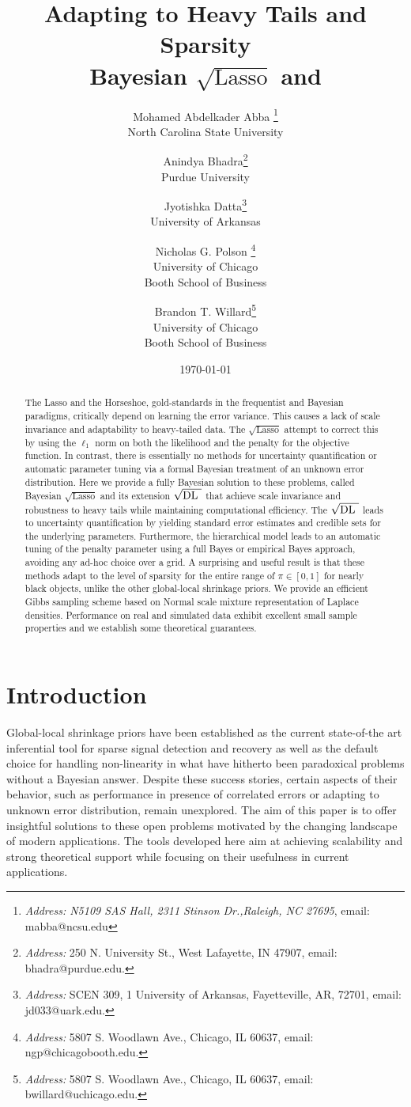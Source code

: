 \documentclass[10pt]{article}
\title{Adapting to Heavy Tails and Sparsity \\
Bayesian $\sqrt{\text{Lasso}}$ and \sqdl{}}
\author{
  Mohamed Abdelkader Abba \footnote{{\em Address: N5109 SAS Hall, 2311 Stinson Dr.,Raleigh, NC 27695}, email: mabba@ncsu.edu} \\
	North Carolina State University 
	\and
  Anindya Bhadra\footnote{
  {\em Address:} 250 N. University St., West Lafayette, IN 47907, 
  email: bhadra@purdue.edu.} \\
  Purdue University
  \and Jyotishka Datta\footnote{
  {\em Address:} SCEN 309, 1 University of Arkansas, Fayetteville, AR, 72701, 
  email: jd033@uark.edu.}\\ 
  University of Arkansas \\
  \and Nicholas G. Polson \footnote{
  {\em Address:} 5807 S. Woodlawn Ave., Chicago, IL 60637, 
  email: ngp@chicagobooth.edu.}  \\
  University of Chicago  \\
  Booth School of Business
  \and 
  Brandon T. Willard\footnote{
  {\em Address:} 5807 S. Woodlawn Ave., Chicago, IL 60637, 
  email: bwillard@uchicago.edu.} \\
  University of Chicago  \\
  Booth School of Business
}
\date{\today}
\def\sql{$\sqrt{\text{Lasso}}$}
\def\sqdl{$\sqrt{\text{\rm{DL} }}$}
\begin{document}
\maketitle

\begin{abstract}
\noindent 
The Lasso and the Horseshoe, gold-standards in the frequentist and Bayesian paradigms, critically depend on learning the error variance. This causes a lack of scale invariance and adaptability to heavy-tailed data. The \sql{} \citep{belloni2011square} attempt to correct this by using the $\ell_1$ norm on both the likelihood and the penalty for the objective function. In contrast, there is essentially no methods for uncertainty quantification or automatic parameter tuning via a formal Bayesian treatment of an unknown error distribution. Here we provide a fully Bayesian solution to these problems, called Bayesian \sql{} and its extension \sqdl{} that achieve scale invariance and robustness to heavy tails while maintaining computational efficiency. %
The \sqdl{} leads to uncertainty quantification by yielding standard error estimates and credible sets for the underlying parameters. Furthermore, the hierarchical model leads to an automatic tuning of the penalty parameter using a full Bayes or empirical Bayes approach, avoiding any ad-hoc choice over a grid. A surprising and useful result is that these methods adapt to the level of sparsity for the entire range of $\pi \in [0,1]$ for nearly black objects, unlike the other global-local shrinkage priors. We provide an efficient Gibbs sampling scheme based on Normal scale mixture representation of Laplace densities. Performance on real and simulated data exhibit excellent small sample properties and we establish some theoretical guarantees. 
\end{abstract}



\section{Introduction}

Global-local shrinkage priors have been established as the current state-of-the art inferential tool for sparse signal detection and recovery as well as the default choice for handling non-linearity in what have hitherto been paradoxical problems without a Bayesian answer. Despite these success stories, certain aspects of their behavior, such as performance in presence of correlated errors or adapting to unknown error distribution, remain unexplored. The aim of this paper is to offer insightful solutions to these open problems motivated by the changing landscape of modern applications. The tools developed here aim at achieving scalability and strong theoretical support while focusing on their usefulness in current applications. 
\end{document}
